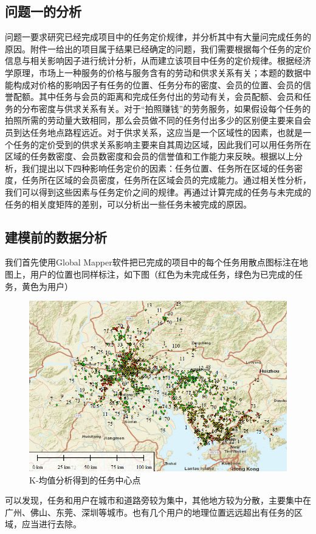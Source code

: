 \documentclass[withoutpreface,bwprint]{cumcmthesis} %
\begin{document}
\subsection{问题一的分析}
问题一要求研究已经完成项目中的任务定价规律，并分析其中有大量问完成任务的原因。附件一给出的项目属于结果已经确定的问题，我们需要根据每个任务的定价信息与相关影响因子进行统计分析，从而建立该项目中任务的定价规律。根据经济学原理，市场上一种服务的价格与服务含有的劳动和供求关系有关；本题的数据中能构成对价格的影响因子有任务的位置、任务分布的密度、会员的位置、会员的信誉配额。其中任务与会员的距离和完成任务付出的劳动有关，会员配额、会员和任务的分布密度与供求关系有关。对于“拍照赚钱”的劳务服务，如果假设每个任务的拍照所需的劳动量大致相同，那么会员做不同的任务付出多少的区别便主要来自会员到达任务地点路程远近。对于供求关系，这应当是一个区域性的因素，也就是一个任务的定价受到的供求关系影响主要来自其周边区域，因此我们可以用任务所在区域的任务数密度、会员数密度和会员的信誉值和工作能力来反映。根据以上分析，我们提出以下四种影响任务定价的因素：任务位置、任务所在区域的任务密度，任务所在区域的会员密度，任务所在区域会员的完成能力。通过相关性分析，我们可以得到这些因素与任务定价之间的规律。再通过计算完成的任务与未完成的任务的相关度矩阵的差别，可以分析出一些任务未被完成的原因。

\subsection{建模前的数据分析}
我们首先使用Global Mapper软件把已完成的项目中的每个任务用散点图标注在地图上，用户的位置也同样标注，如下图（红色为未完成任务，绿色为已完成的任务，黄色为用户）

\begin{figure}[H]
    \centering
    \includegraphics[width=15cm]{1.png}
    \caption{K-均值分析得到的任务中心点}
    \label{图}
\end{figure}
可以发现，任务和用户在城市和道路旁较为集中，其他地方较为分散，主要集中在广州、佛山、东莞、深圳等城市。也有几个用户的地理位置远远超出有任务的区域，应当进行去除。
\end{document}
